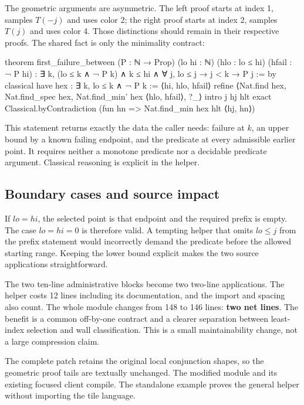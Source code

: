 \documentclass[11pt,a4paper]{article}
\begin{document}
The geometric arguments are asymmetric. The left proof starts at index 1, samples $T(-j)$ and uses color 2; the right proof starts at index 2, samples $T(j)$ and uses color 4. Those distinctions should remain in their respective proofs. The shared fact is only the minimality contract:
\begin{Lean}
theorem first_failure_between (P : ℕ → Prop) (lo hi : ℕ)
    (hlo : lo ≤ hi) (hfail : ¬ P hi) :
    ∃ k, (lo ≤ k ∧ ¬ P k) ∧ k ≤ hi ∧
      ∀ j, lo ≤ j → j < k → P j := by
  classical
  have hex : ∃ k, lo ≤ k ∧ ¬ P k := ⟨hi, hlo, hfail⟩
  refine ⟨Nat.find hex, Nat.find_spec hex,
    Nat.find_min' hex ⟨hlo, hfail⟩, ?_⟩
  intro j hj hlt
  exact Classical.byContradiction
    (fun hn => Nat.find_min hex hlt ⟨hj, hn⟩)
\end{Lean}

This statement returns exactly the data the caller needs: failure at $k$, an upper bound by a known failing endpoint, and the predicate at every admissible earlier point. It requires neither a monotone predicate nor a decidable predicate argument. Classical reasoning is explicit in the helper.

\subsection{Boundary cases and source impact}

If $\mathit{lo}=\mathit{hi}$, the selected point is that endpoint and the required prefix is empty. The case $\mathit{lo}=\mathit{hi}=0$ is therefore valid. A tempting helper that omits $\mathit{lo}\le j$ from the prefix statement would incorrectly demand the predicate before the allowed starting range. Keeping the lower bound explicit makes the two source applications straightforward.

The two ten-line administrative blocks become two two-line applications. The helper costs 12 lines including its documentation, and the import and spacing also count. The whole module changes from 148 to 146 lines: \textbf{two net lines}. The benefit is a common off-by-one contract and a clearer separation between least-index selection and wall classification. This is a small maintainability change, not a large compression claim.

The complete patch retains the original local conjunction shapes, so the geometric proof tails are textually unchanged. The modified module and its existing focused client compile. The standalone example proves the general helper without importing the tile language.
\end{document}

